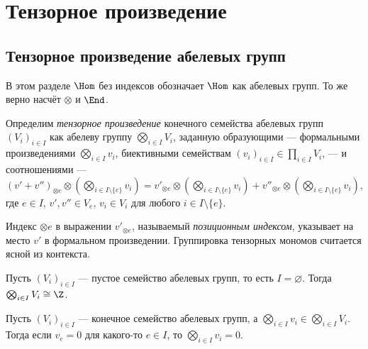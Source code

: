 \documentclass[
	extrafontsizes,
	11pt,
	hyphens,
]{memoir}
\begin{document}
\section{Тензорное произведение}

\subsection{Тензорное произведение абелевых групп}

\begin{notation}
В этом разделе \(\Hom\) без индексов обозначает \(\Hom\) как абелевых групп. То же верно насчёт \(\otimes\) и \(\End\).
\end{notation}

\begin{definition} \label{def:AbTensorProd}
Определим \emph{тензорное произведение} конечного семейства абелевых групп \((V_i)_{i \in I}\) как абелеву группу \(\bigotimes_{i \in I} V_i\),
заданную образующими --- формальными произведениями \(\bigotimes_{i \in I} v_i\),
биективными семействам \((v_i)_{i \in I} \in \prod_{i \in I} V_i\),
--- и соотношениями ---
\(
\textstyle
(v' + v'')_{\otimes e} \otimes (\bigotimes_{i \in I \setminus \{e\}} v_i) =
v'_{\otimes e} \otimes (\bigotimes_{i \in I \setminus \{e\}} v_i) +
v''_{\otimes e} \otimes (\bigotimes_{i \in I \setminus \{e\}} v_i),
\)
где \(e \in I\),
\(v', v'' \in V_e\),
\(v_i \in V_i\) для любого \(i \in I \setminus \{e\}\).
\end{definition}

\begin{remark}
Индекс \(\otimes e\) в выражении \(v'_{\otimes e}\), называемый \emph{позиционным индексом}, указывает на место \(v'\) в формальном произведении. 
Группировка тензорных мономов считается ясной из контекста.
\end{remark}

\begin{observation}
Пусть \((V_i)_{i \in I}\) --- пустое семейство абелевых групп, то есть \(I = \varnothing\).
Тогда \(\bigotimes_{i \in I} V_i \cong \Z\).
\end{observation}

\begin{observation}
Пусть \((V_i)_{i \in I}\) --- конечное семейство абелевых групп, а \(\bigotimes_{i \in I} v_i \in \bigotimes_{i \in I} V_i\). Тогда если \(v_e = 0\) для какого-то \(e \in I\), то \(\bigotimes_{i \in I} v_i = 0\).
\end{observation}
\end{document}
